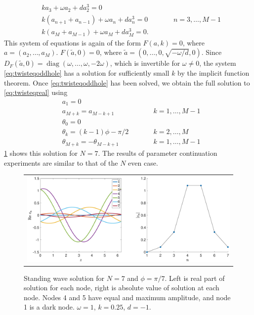 \documentclass[12pt]{article}
\DeclareMathOperator{\diag}{diag}
\begin{document}
\begin{equation}\label{eq:twisteqoddhole}
\begin{aligned}
& k a_3 + \omega a_2 + d a_2^3 = 0\\
&k( a_{n+1} + a_{n-1} ) + \omega a_n + d a_n^3 = 0 && \qquad n = 3, \dots, M-1 \\
&k ( a_M + a_{M-1} ) + \omega a_M + d a_M^3 = 0.
\end{aligned}
\end{equation}
This system of equations is again of the form $F(a,k) = 0$, where $a = (a_2, \dots, a_M)$. $F(\tilde{a}, 0) = 0$, where $\tilde{a} = (0, \dots, 0, \sqrt{-\omega/d}, 0)$. Since $D_F(\tilde{a}, 0) = \diag(\omega, \dots, \omega, -2\omega)$, which is invertible for $\omega \neq 0$, the system \cref{eq:twisteqoddhole} has a solution for sufficiently small $k$ by the implicit function theorem. Once \cref{eq:twisteqoddhole} has been solved, we obtain the full solution to \cref{eq:twisteqreal} using
\begin{align*}
&a_1 = 0 \\
&a_{M+k} = a_{M-k+1} && \qquad k = 1, \dots, M-1 \\
&\theta_0 = 0 \\
&\theta_k = (k-1)\phi - \pi/2 && \qquad k = 2, \dots, M \\
&\theta_{M+k} = -\theta_{M-k+1} && \qquad k = 1, \dots, M-1
\end{align*}
\cref{fig:oddhole7} shows this solution for $N=7$. The results of parameter continuation experiments are similar to that of the $N$ even case.
\begin{figure}[H]
\begin{center}
\begin{tabular}{c}
\includegraphics[width=15cm]{images/oddhole7.eps}
\end{tabular}
\end{center}
\caption{Standing wave solution for $N = 7$ and $\phi = \pi/7$. Left is real part of solution for each node, right is absolute value of solution at each node. Nodes 4 and 5 have equal and maximum amplitude, and node 1 is a dark node. $\omega = 1$, $k = 0.25$, $d=-1$.}
\label{fig:oddhole7}
\end{figure}
\end{document}
